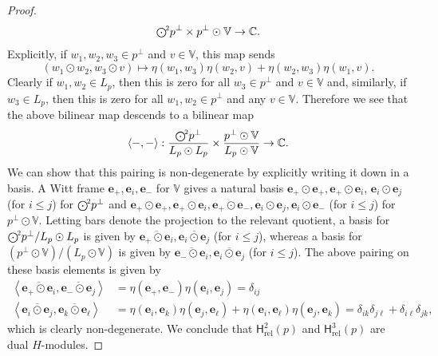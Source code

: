 \documentclass[10pt,a4paper]{amsart}
\newcommand{\CC}{\mathbb{C}}
\newcommand{\Hrel}{\mathsf{H}_{\mathrm{rel}}}
\newcommand{\VV}{\mathbb{V}}
\newcommand{\be}{\boldsymbol{e}}
\newcommand\sym[1]{\scalebox{.85}{$\bigodot^{\!#1}$}}
\begin{document}
\begin{proof}
  \begin{equation}
    \sym{2} p^\perp \times p^\perp \odot \VV \to \CC.
  \end{equation}
  Explicitly, if $w_1,w_2,w_3 \in p^\perp$ and $v \in \VV$, this map
  sends
  \begin{equation}
    (w_1 \odot w_2, w_3 \odot v) \mapsto \eta(w_1,w_3) \eta(w_2,v) + \eta(w_2,w_3) \eta(w_1,v).
  \end{equation}
  Clearly if $w_1, w_2 \in L_p$, then this is zero for all $w_3 \in
  p^\perp$ and $v \in \VV$ and, similarly, if $w_3 \in L_p$, then this
  is zero for all $w_1,w_2 \in p^\perp$ and any $v \in \VV$.  Therefore
  we see that the above bilinear map descends to a bilinear map
  \begin{equation}
    \left<-,-\right> : \dfrac{\sym{2} p^\perp}{L_p \odot L_p} \times \dfrac{p^\perp \odot \VV}{L_p \odot \VV} \to \CC.
  \end{equation}
  We can show that this pairing is non-degenerate by explicitly
  writing it down in a basis.  A Witt frame $\be_+,\be_i,
  \be_-$ for $\VV$ gives a natural basis $\be_+ \odot \be_+, \be_+
  \odot \be_i$, $\be_i \odot \be_j$ (for $i\leq j$) for $\sym{2}p^\perp$
  and $\be_+\odot \be_+, \be_+ \odot \be_i, \be_+\odot \be_-, \be_i
  \odot \be_j, \be_i \odot \be_-$ (for $i\leq j$) for $p^\perp \odot
  \VV$. Letting bars denote the projection to the relevant quotient, a
  basis for $\sym{2}p^\perp/L_p \odot L_p$ is given by
  $\overline{\be_+ \odot \be_i}, \overline{\be_i \odot \be_j}$ (for 
  $i\leq j$), whereas a basis for $(p^\perp \odot \VV)/(L_p \odot
  \VV)$ is given by $\overline{\be_- \odot \be_i}, \overline{\be_i
    \odot \be_j}$ (for $i\leq j$).  The above pairing on these basis
  elements is given by
  \begin{equation}
    \begin{split}
      \left<\overline{\be_+ \odot \be_i}, \overline{\be_- \odot
          \be_j}\right> &= \eta(\be_+,\be_-) \eta(\be_i, \be_j) = \delta_{ij}\\
      \left<\overline{\be_i \odot \be_j}, \overline{\be_k \odot
          \be_\ell}\right> &= \eta(\be_i, \be_k) \eta(\be_j,\be_\ell)
      +  \eta(\be_i, \be_\ell) \eta(\be_j,\be_k) = \delta_{ik}\delta_{j\ell} +  \delta_{i\ell} \delta_{jk},
  \end{split}
\end{equation}
which is clearly non-degenerate.  We conclude that $\Hrel^2(p)$ and
$\Hrel^3(p)$ are dual $H$-modules.
\end{proof}
\end{document}
